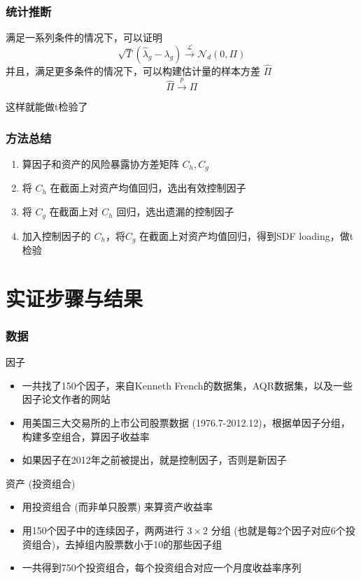 \documentclass[
  UTF8,
  xcolor={dvipsnames,rgb},
  hyperref={colorlinks, citecolor=orange, linkcolor=black},
  aspectratio=169
  ]{beamer}
\begin{document}
\begin{frame}
    \frametitle{统计推断}

    \begin{theorem}
        满足一系列条件的情况下，可以证明
        \[\sqrt{T}(\hat{\lambda}_g-\lambda_g) \xrightarrow{\mathcal{L}} \mathcal{N}_d (0,\Pi)\]
        并且，满足更多条件的情况下，可以构建估计量的样本方差 \(\hat{\Pi}\)
        \[\hat{\Pi} \xrightarrow{p} \Pi\]
    \end{theorem}
    这样就能做t检验了
\end{frame}

\begin{frame}
    \frametitle{方法总结}

    \begin{enumerate}
        \item 算因子和资产的风险暴露协方差矩阵 \(C_h,C_g\)
        \item 将 \(C_h\) 在截面上对资产均值回归，选出有效控制因子
        \item 将 \(C_g\) 在截面上对 \(C_h\) 回归，选出遗漏的控制因子
        \item 加入控制因子的 \(C_h\)，将\(C_g\) 在截面上对资产均值回归，得到SDF loading，做t检验
    \end{enumerate}
\end{frame}

\section{实证步骤与结果}

\begin{frame}
    \frametitle{数据}
    
    \begin{wideitemize}
        \item 因子 \begin{itemize}
            \item 一共找了150个因子，来自Kenneth French的数据集，AQR数据集，以及一些因子论文作者的网站
            \item 用美国三大交易所的上市公司股票数据 (1976.7-2012.12)，根据单因子分组，构建多空组合，算因子收益率
            \item 如果因子在2012年之前被提出，就是控制因子，否则是新因子
        \end{itemize}
        \item 资产 (投资组合) \begin{itemize}
            \item 用投资组合 (而非单只股票) 来算资产收益率
            \item 用150个因子中的连续因子，两两进行 \(3 \times 2\) 分组 (也就是每2个因子对应6个投资组合)，去掉组内股票数小于10的那些因子组
            \item 一共得到750个投资组合，每个投资组合对应一个月度收益率序列
        \end{itemize}
    \end{wideitemize}
\end{frame}
\end{document}
